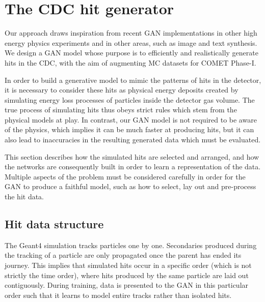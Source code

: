 \section{The CDC hit generator}
Our approach draws inspiration from recent GAN implementations in other high
energy physics experiments and in other areas, such as image and text
synthesis. We design a GAN model whose purpose is to efficiently and
realistically generate hits in the CDC, with the aim of augmenting MC datasets
for COMET Phase-I.

In order to build a generative model to mimic the patterns of hits in the
detector, it is necessary to consider these hits as physical energy
deposits created by simulating energy loss processes of particles inside the
detector gas volume. The true process of simulating hits thus obeys strict rules
which stem from the physical models at play. In contrast, our GAN model is not
required to be aware of the physics, which implies it can be much faster at
producing hits, but it can also lead to inaccuracies in the resulting generated
data which must be evaluated.

This section describes how the simulated hits are selected and arranged, and how
the networks are consequently built in order to learn a representation of the
data. Multiple aspects of the problem must be considered carefully in order for
the GAN to produce a faithful model, such as how to select, lay out and
pre-process the hit data.


\subsection{Hit data structure}
\label{sec:hit_data_structure}

The {\sc Geant4} simulation tracks particles one by one. Secondaries
produced during the tracking of a particle are only propagated once the parent
has ended its journey. This implies that simulated hits occur in a specific
order (which is not strictly the time order), where hits produced by the same
particle are laid out contiguously. During training, data is presented to the
GAN in this particular order such that it learns to model entire tracks rather
than isolated hits.


